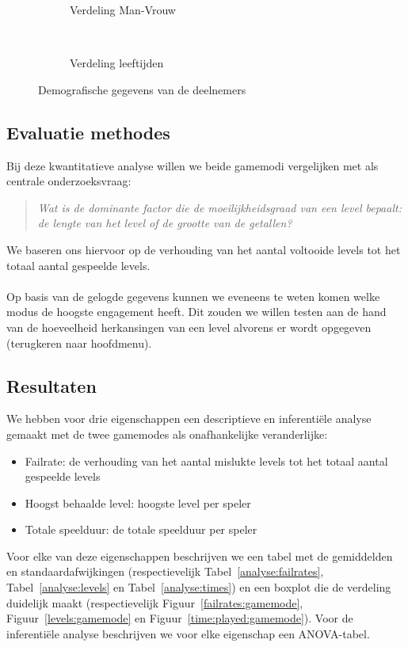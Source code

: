\documentclass[11pt]{article}
\begin{document}
\begin{figure}[h]
	\centering
	\begin{subfigure}[b]{0.45\textwidth}
    	\centering
		\caption{Verdeling Man-Vrouw}\label{verdeling:man:vrouw}
    \end{subfigure}
    ~
    \begin{subfigure}[b]{0.45\textwidth}
    	\centering
		\caption{Verdeling leeftijden}\label{verdeling:leeftijden}
    \end{subfigure}
    \caption{Demografische gegevens van de deelnemers}
\end{figure}

\newpage
    \subsection{Evaluatie methodes}
Bij deze kwantitatieve analyse willen we beide gamemodi vergelijken met als centrale onderzoeksvraag: 
\begin{quote} \textit{Wat is de dominante factor die de moeilijkheidsgraad van een level bepaalt: de lengte van het level of de grootte van de getallen?}
\end{quote}
We baseren ons hiervoor op de verhouding van het aantal voltooide levels tot het totaal aantal gespeelde levels.\\\\
Op basis van de gelogde gegevens kunnen we eveneens te weten komen welke modus de hoogste engagement heeft. Dit zouden we willen testen aan de hand van de hoeveelheid herkansingen van een level alvorens er wordt opgegeven (terugkeren naar hoofdmenu).

	\subsection{Resultaten}
We hebben voor drie eigenschappen een descriptieve en inferenti\"ele analyse gemaakt met de twee gamemodes als onafhankelijke veranderlijke:
\begin{itemize}
\item Failrate: de verhouding van het aantal mislukte levels tot het totaal aantal gespeelde levels
\item Hoogst behaalde level: hoogste level per speler
\item Totale speelduur: de totale speelduur per speler
\end{itemize}
Voor elke van deze eigenschappen beschrijven we een tabel met de gemiddelden en standaardafwijkingen (respectievelijk Tabel~\ref{analyse:failrates}, Tabel~\ref{analyse:levels} en Tabel~\ref{analyse:times}) en een boxplot die de verdeling duidelijk maakt (respectievelijk Figuur~\ref{failrates:gamemode}, Figuur~\ref{levels:gamemode} en Figuur~\ref{time:played:gamemode}). Voor de inferenti\"ele analyse beschrijven we voor elke eigenschap een ANOVA-tabel.
\end{document}
